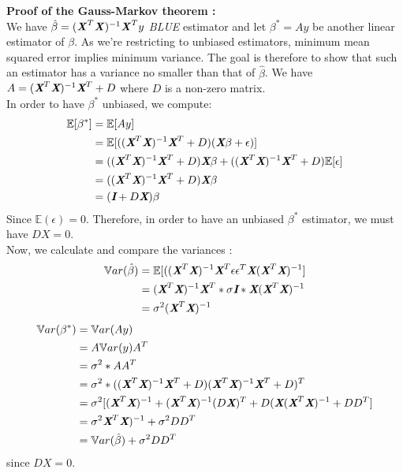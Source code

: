 \documentclass[a4paper,12pt]{article}
\begin{document}
\textbf{Proof of the Gauss-Markov theorem :} 
\\ We have \(\hat{\beta} = (\textbf{\textit{X}}^T\textbf{\textit{X}})^{-1} \textbf{\textit{X}}^T y\) \textit{BLUE} estimator and let \(\beta^* = A y\) be another linear estimator of \(\beta\). As we're restricting to unbiased estimators, minimum mean squared error implies minimum variance. The goal is therefore to show that such an estimator has a variance no smaller than that of \(\hat{\beta}\). 
We have \(A = (\textit{\textbf{X}}^T \textit{\textbf{X}})^{-1} \textit{\textbf{X}}^T + D\) where \(D\) is a non-zero matrix. 
\\ In order to have \(\beta^*\) unbiased, we compute: 
\begin{align*}
\mathbb{E}[\beta^*] &= \mathbb{E}[Ay] \\  &= \mathbb{E}[((\textit{\textbf{X}}^T \textit{\textbf{X}})^{-1} \textit{\textbf{X}}^T + D)(\textit{\textbf{X}}\beta + \epsilon)] \\
& = ((\textit{\textbf{X}}^T \textit{\textbf{X}})^{-1} \textit{\textbf{X}}^T + D)\textit{\textbf{X}}\beta + ((\textit{\textbf{X}}^T \textit{\textbf{X}})^{-1} \textit{\textbf{X}}^T + D)\mathbb{E}[\epsilon] \\ &= ((\textit{\textbf{X}}^T \textit{\textbf{X}})^{-1} \textit{\textbf{X}}^T + D)\textit{\textbf{X}}\beta \\ &=  (\textit{\textbf{I}} + D\textit{\textbf{X}})\beta
\end{align*}Since \(\mathbb{E}(\epsilon) = 0\). Therefore, in order to have an unbiased  \(\beta^*\) estimator, we must have \(DX = 0\). \\
Now, we calculate and compare the variances :
\begin{align*}
\mathbb{V}ar(\hat{\beta}) &= \mathbb{E}[((\textit{\textbf{X}}^T \textit{\textbf{X}})^{-1} \textit{\textbf{X}}^T \epsilon \epsilon^T \textit{\textbf{X}} (\textit{\textbf{X}}^T \textit{\textbf{X}})^{-1}] \\  &= (\textit{\textbf{X}}^T \textit{\textbf{X}})^{-1} \textit{\textbf{X}}^T * \sigma \textit{\textbf{I}} * \textit{\textbf{X}} (\textit{\textbf{X}}^T \textit{\textbf{X}})^{-1} \\
& = \sigma^2 (\textit{\textbf{X}}^T \textit{\textbf{X}})^{-1} 
\end{align*}
\begin{align*}
\mathbb{V}ar(\beta^*) &= \mathbb{V}ar(Ay)  \\  &= A\mathbb{V}ar(y)A^T \\
& = \sigma^2*AA^T \\ &= \sigma^2*((\textit{\textbf{X}}^T \textit{\textbf{X}})^{-1} \textit{\textbf{X}}^T + D)(\textit{\textbf{X}}^T \textit{\textbf{X}})^{-1} \textit{\textbf{X}}^T + D)^T \\ &= \sigma^2[(\textit{\textbf{X}}^T\textit{\textbf{X}})^{-1} + (\textit{\textbf{X}}^T\textit{\textbf{X}})^{-1}(D\textit{\textbf{X}})^T + D(\textit{\textbf{X}}(\textit{\textbf{X}}^T\textit{\textbf{X}})^{-1} + DD^T] \\ &= \sigma^2\textit{\textbf{X}}^T\textit{\textbf{X}})^{-1} + \sigma^2 DD^T \\ &= \mathbb{V}ar(\hat{\beta}) + \sigma^2 DD^T
\end{align*}since \(DX = 0\). \\
\end{document}
